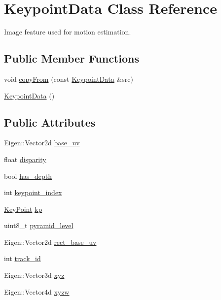 \hypertarget{classfovis_1_1KeypointData}{
\section{KeypointData Class Reference}
\label{classfovis_1_1KeypointData}
}


Image feature used for motion estimation.  


\subsection*{Public Member Functions}
\begin{DoxyCompactItemize}
\item 
void \hyperlink{classfovis_1_1KeypointData_a9d6e34eb80522b5204f34ebe06a4fab9}{copyFrom} (const \hyperlink{classfovis_1_1KeypointData}{KeypointData} \&src)
\item 
\hyperlink{classfovis_1_1KeypointData_ae53890a21c24b0add109be507ffaf214}{KeypointData} ()
\end{DoxyCompactItemize}
\subsection*{Public Attributes}
\begin{DoxyCompactItemize}
\item 
Eigen::Vector2d \hyperlink{classfovis_1_1KeypointData_ac37015bdf7c90c14e5563d6772bac549}{base\_\-uv}
\item 
float \hyperlink{classfovis_1_1KeypointData_a312732f219960346581401b33cf44d5f}{disparity}
\item 
bool \hyperlink{classfovis_1_1KeypointData_a896725c2a47d00963355b4bb31531af8}{has\_\-depth}
\item 
int \hyperlink{classfovis_1_1KeypointData_ad7b7d5d0b809d0fa300e7a78c0ddfdef}{keypoint\_\-index}
\item 
\hyperlink{classfovis_1_1KeyPoint}{KeyPoint} \hyperlink{classfovis_1_1KeypointData_a735862645891486a2f4d30e0c41a6ead}{kp}
\item 
uint8\_\-t \hyperlink{classfovis_1_1KeypointData_a0a8d2f07bec8e75e0928d567cc0fb128}{pyramid\_\-level}
\item 
Eigen::Vector2d \hyperlink{classfovis_1_1KeypointData_a49f1a8f0899d5dafe1917d0298d6ccc0}{rect\_\-base\_\-uv}
\item 
int \hyperlink{classfovis_1_1KeypointData_a8e64acfab4c3eba5b36eb3b6f15b9434}{track\_\-id}
\item 
Eigen::Vector3d \hyperlink{classfovis_1_1KeypointData_a3718bd38e2607f9ae26d6b72ee203bb2}{xyz}
\item 
Eigen::Vector4d \hyperlink{classfovis_1_1KeypointData_a3429cc278fa5be99ed3308ca5852d9e7}{xyzw}
\end{DoxyCompactItemize}


